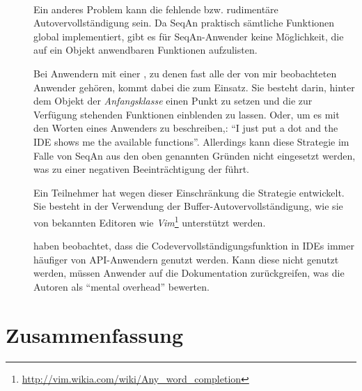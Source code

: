 \begin{itemize}
\begin{description}
    \item[] \textbf{} \\
    Ein anderes Problem kann die fehlende bzw. rudimentäre Autovervollständigung sein. Da SeqAn praktisch sämtliche Funktionen global implementiert, gibt es für SeqAn-Anwender keine Möglichkeit, die auf ein Objekt anwendbaren Funktionen aufzulisten.
  
    Bei Anwendern mit einer , zu denen fast alle der von mir beobachteten Anwender gehören, kommt dabei die   zum Einsatz. Sie besteht darin, hinter dem Objekt der \textit{Anfangsklasse} \citep[vgl.  bzw.][]{Stylos:2008jt} einen Punkt zu setzen und die zur Verfügung stehenden Funktionen einblenden zu lassen. Oder, um es mit den Worten eines Anwenders zu beschreiben,: ``I just put a dot and the IDE shows me the available functions''. Allerdings kann diese Strategie im Falle von SeqAn aus den oben genannten Gründen nicht eingesetzt werden, was zu einer negativen Beeinträchtigung der  führt.
  
    Ein Teilnehmer hat wegen dieser Einschränkung die Strategie  entwickelt. Sie besteht in der Verwendung der Buffer-Autovervollständigung, wie sie von bekannten Editoren wie \textit{Vim}\footnote{\url{http://vim.wikia.com/wiki/Any_word_completion}} unterstützt werden.
    
    \cite{Omar:2012tw} haben beobachtet, dass die Codevervollständigungsfunktion in IDEs immer häufiger von API-Anwendern genutzt werden. Kann diese nicht genutzt werden, müssen Anwender auf die Dokumentation zurückgreifen, was die Autoren als ``mental overhead'' bewerten.  
  \end{description}  
  
\end{itemize}



\section{Zusammenfassung}

